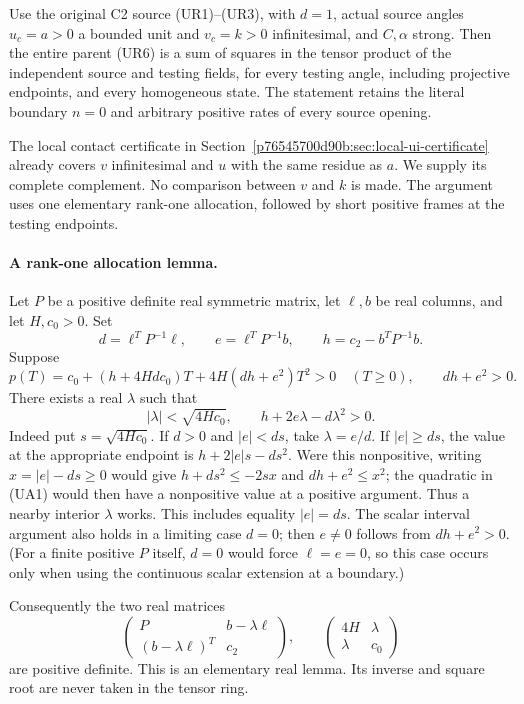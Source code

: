 \label{p6b22e944bd7c:sec:ui-all-tests-recovered}

\begin{theorem}
Use the original C2 source (UR1)--(UR3), with $d=1$, actual source
angles $u_c=a>0$ a bounded unit and $v_c=k>0$ infinitesimal, and
$C,\alpha$ strong. Then the entire parent (UR6) is a sum of squares
in the tensor product of the independent source and testing fields,
for every testing angle, including projective endpoints, and every
homogeneous state. The statement retains the literal boundary $n=0$
and arbitrary positive rates of every source opening.
\end{theorem}

The local contact certificate in Section~\ref{p76545700d90b:sec:local-ui-certificate}
already covers $v$ infinitesimal and $u$ with the same residue as $a$.
We supply its complete complement. No comparison between $v$ and $k$
is made. The argument uses one elementary rank-one allocation, followed
by short positive frames at the testing endpoints.

\paragraph{A rank-one allocation lemma.}
Let $P$ be a positive definite real symmetric matrix, let $\ell,b$ be
real columns, and let $H,c_0>0$. Set
\[
 d=\ell^TP^{-1}\ell,\qquad e=\ell^TP^{-1}b,\qquad
 h=c_2-b^TP^{-1}b.
\]
Suppose
\[
 p(T)=c_0+(h+4Hdc_0)T+4H(dh+e^2)T^2>0\quad(T\ge0),
 \qquad dh+e^2>0.                                      \tag{UA1}
\]
There exists a real $\lambda$ such that
\[
 |\lambda|<\sqrt{4Hc_0},\qquad
 h+2e\lambda-d\lambda^2>0.                             \tag{UA2}
\]
Indeed put $s=\sqrt{4Hc_0}$. If $d>0$ and $|e|<ds$, take
$\lambda=e/d$. If $|e|\ge ds$, the value at the appropriate endpoint
is $h+2|e|s-ds^2$. Were this nonpositive, writing
$x=|e|-ds\ge0$ would give
$h+ds^2\le-2sx$ and $dh+e^2\le x^2$; the quadratic in (UA1)
would then have a nonpositive value at a positive argument. Thus a
nearby interior $\lambda$ works. This includes equality $|e|=ds$.
The scalar interval argument also holds in a limiting case $d=0$;
then $e\ne0$ follows from $dh+e^2>0$. (For a finite positive $P$
itself, $d=0$ would force $\ell=e=0$, so this case occurs only
when using the continuous scalar extension at a boundary.)

Consequently the two real matrices
\[
 \begin{pmatrix}P&b-\lambda\ell\\(b-\lambda\ell)^T&c_2\end{pmatrix},
 \qquad
 \begin{pmatrix}4H&\lambda\\\lambda&c_0\end{pmatrix}       \tag{UA3}
\]
are positive definite. This is an elementary real lemma. Its inverse
and square root are never taken in the tensor ring.


